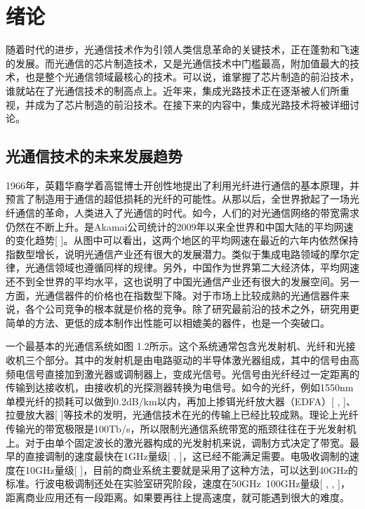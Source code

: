 \documentclass[oneside]{ZJUthesis}
\begin{document}
\ZJUcontents

\ZJUmainmatter

\chapter{绪论}

随着时代的进步，光通信技术作为引领人类信息革命的关键技术，正在蓬勃和飞速的发展。而光通信的芯片制造技术，又是光通信技术中门槛最高，附加值最大的技术，也是整个光通信领域最核心的技术。可以说，谁掌握了芯片制造的前沿技术，谁就站在了光通信技术的制高点上。近年来，集成光路技术正在逐渐被人们所重视，并成为了芯片制造的前沿技术。在接下来的内容中，集成光路技术将被详细讨论。

\section{光通信技术的未来发展趋势}

1966年，英籍华裔学着高锟博士开创性地提出了利用光纤进行通信的基本原理，并预言了制造用于通信的超低损耗的光纤的可能性。从那以后，全世界掀起了一场光纤通信的革命，人类进入了光通信的时代。如今，人们的对光通信网络的带宽需求仍然在不断上升。是Akamai公司统计的2009年以来全世界和中国大陆的平均网速的变化趋势[ ]。从图中可以看出，这两个地区的平均网速在最近的六年内依然保持指数型增长，说明光通信产业还有很大的发展潜力。类似于集成电路领域的摩尔定律，光通信领域也遵循同样的规律。另外，中国作为世界第二大经济体，平均网速还不到全世界的平均水平，这也说明了中国光通信产业还有很大的发展空间。另一方面，光通信器件的价格也在指数型下降。对于市场上比较成熟的光通信器件来说，各个公司竞争的根本就是价格的竞争。除了研究最前沿的技术之外，研究用更简单的方法、更低的成本制作出性能可以相媲美的器件，也是一个突破口。

一个最基本的光通信系统如图 1.2所示。这个系统通常包含光发射机、光纤和光接收机三个部分。其中的发射机是由电路驱动的半导体激光器组成，其中的信号由高频电信号直接加到激光器或调制器上，变成光信号。光信号由光纤经过一定距离的传输到达接收机，由接收机的光探测器转换为电信号。如今的光纤，例如1550nm单模光纤的损耗可以做到0.2dB/km以内，再加上掺铒光纤放大器（EDFA）[ , ]、拉曼放大器[ ]等技术的发明，光通信技术在光的传输上已经比较成熟。理论上光纤传输光的带宽极限是100Tb/s，所以限制光通信系统带宽的瓶颈往往在于光发射机上。对于由单个固定波长的激光器构成的光发射机来说，调制方式决定了带宽。最早的直接调制的速度最快在1GHz量级[ , ]，这已经不能满足需要。电吸收调制的速度在10GHz量级[ ]，目前的商业系统主要就是采用了这种方法，可以达到40GHz的标准。行波电极调制还处在实验室研究阶段，速度在50GHz~100GHz量级[ , , ]，距离商业应用还有一段距离。如果要再往上提高速度，就可能遇到很大的难度。
\end{document}
